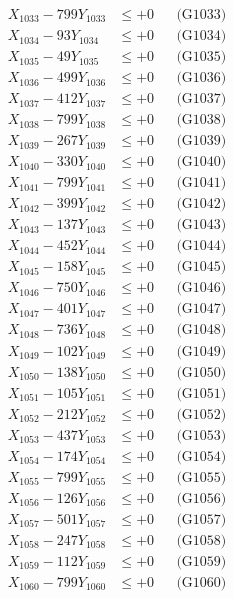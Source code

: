 \documentclass[a4paper,10pt]{article}
\begin{document}
{\begin{align}
X_{1033} - 799Y_{1033} &\leq +0 && \text{(G1033)} \\
X_{1034} - 93Y_{1034} &\leq +0 && \text{(G1034)} \\
X_{1035} - 49Y_{1035} &\leq +0 && \text{(G1035)} \\
X_{1036} - 499Y_{1036} &\leq +0 && \text{(G1036)} \\
X_{1037} - 412Y_{1037} &\leq +0 && \text{(G1037)} \\
X_{1038} - 799Y_{1038} &\leq +0 && \text{(G1038)} \\
X_{1039} - 267Y_{1039} &\leq +0 && \text{(G1039)} \\
X_{1040} - 330Y_{1040} &\leq +0 && \text{(G1040)} \\
\allowbreak
X_{1041} - 799Y_{1041} &\leq +0 && \text{(G1041)} \\
X_{1042} - 399Y_{1042} &\leq +0 && \text{(G1042)} \\
X_{1043} - 137Y_{1043} &\leq +0 && \text{(G1043)} \\
X_{1044} - 452Y_{1044} &\leq +0 && \text{(G1044)} \\
X_{1045} - 158Y_{1045} &\leq +0 && \text{(G1045)} \\
X_{1046} - 750Y_{1046} &\leq +0 && \text{(G1046)} \\
X_{1047} - 401Y_{1047} &\leq +0 && \text{(G1047)} \\
X_{1048} - 736Y_{1048} &\leq +0 && \text{(G1048)} \\
X_{1049} - 102Y_{1049} &\leq +0 && \text{(G1049)} \\
X_{1050} - 138Y_{1050} &\leq +0 && \text{(G1050)} \\
\allowbreak
X_{1051} - 105Y_{1051} &\leq +0 && \text{(G1051)} \\
X_{1052} - 212Y_{1052} &\leq +0 && \text{(G1052)} \\
X_{1053} - 437Y_{1053} &\leq +0 && \text{(G1053)} \\
X_{1054} - 174Y_{1054} &\leq +0 && \text{(G1054)} \\
X_{1055} - 799Y_{1055} &\leq +0 && \text{(G1055)} \\
X_{1056} - 126Y_{1056} &\leq +0 && \text{(G1056)} \\
X_{1057} - 501Y_{1057} &\leq +0 && \text{(G1057)} \\
X_{1058} - 247Y_{1058} &\leq +0 && \text{(G1058)} \\
X_{1059} - 112Y_{1059} &\leq +0 && \text{(G1059)} \\
X_{1060} - 799Y_{1060} &\leq +0 && \text{(G1060)} \\

\end{align}}
\end{document}
